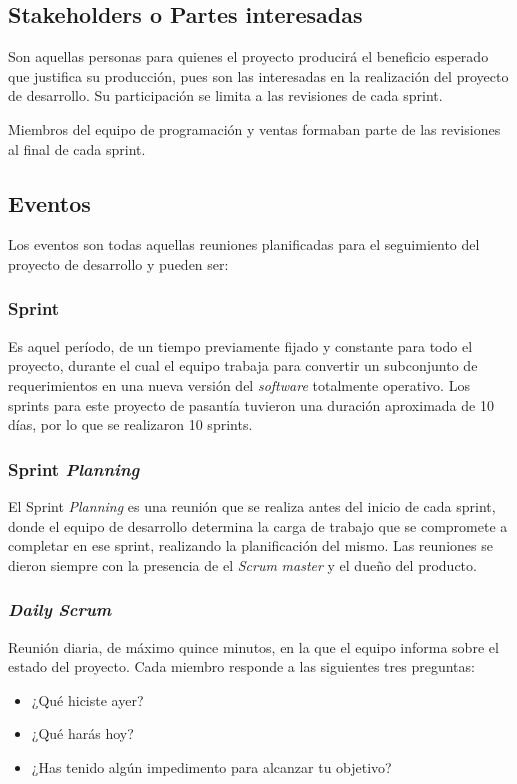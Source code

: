 \subsection{Stakeholders o Partes interesadas}
Son aquellas personas para quienes el proyecto producirá el beneficio esperado que justifica su producción, pues son las interesadas en la realización del proyecto de desarrollo. Su participación se limita a las revisiones de cada sprint.

Miembros del equipo de programación y ventas formaban parte de las revisiones al final de cada sprint.

\subsection{Eventos}
Los eventos son todas aquellas reuniones planificadas para el seguimiento del proyecto de desarrollo y pueden ser:

\subsubsection{Sprint}
Es aquel período, de un tiempo previamente fijado y constante para todo el proyecto, durante el cual el equipo trabaja para convertir un subconjunto de requerimientos en una nueva versión del \emph{software} totalmente operativo. Los sprints para este proyecto de pasantía tuvieron una duración aproximada de 10 días, por lo que se realizaron 10 sprints.

\subsubsection{Sprint \emph{Planning}}
El Sprint \emph{Planning} es una reunión que se realiza antes del inicio de cada sprint, donde el equipo de desarrollo determina la carga de trabajo que se compromete a completar en ese sprint, realizando la planificación del mismo. Las reuniones se dieron siempre con la presencia de el \emph{Scrum} \emph{master} y el dueño del producto.

\subsubsection{\emph{Daily} \emph{Scrum}}
Reunión diaria, de máximo quince minutos, en la que el equipo informa sobre el estado del proyecto. Cada miembro responde a las siguientes tres preguntas:

\begin{itemize}
	\item 	¿Qué hiciste ayer?
	\item 	¿Qué harás hoy?
	\item 	¿Has tenido algún impedimento para alcanzar tu objetivo?
\end{itemize}

